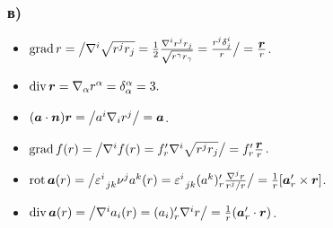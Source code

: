 \subsubsection*{в)}
	\begin{itemize}
	\itemsep0pt
		\item  $\mathop{\mathrm{grad}}\nolimits r = \big/ \nabla^i \sqrt{r^j r_j} = \frac{1}{2}\frac{\nabla^i r^j r_j}{\sqrt{r^\gamma r_\gamma}} = \frac{r^j \delta_{j}^{i}}{r} \big/ = \frac{\mbox{\boldmath $r$}}{r}$.

		\item $\mathop{\mathrm{div}}\nolimits \mbox{\boldmath $r$} = \nabla_\alpha r^\alpha = \delta_\alpha^\alpha = 3. \phantom{\big/} $

		\item $(\mbox{\boldmath $a$} \cdot \mbox{\boldmath $n$}) \mbox{\boldmath $r$}= \big/ a^i \nabla_i r^j \big/ = \mbox{\boldmath $a$}$.

		\item $\mathop{\mathrm{grad}}\nolimits f (r) = \big/
		\nabla^i f(r) = f_r' \nabla^i \sqrt{r^j r_j}
		\big/ = f_r' \frac{\mbox{\boldmath $r$}}{r}$.

		\item $\mathop{\mathrm{rot}}\nolimits \mbox{\boldmath $a$}(r) = \big/ \varepsilon_{\phantom{0} j k}^{i} \nu^j a^k(r) = \varepsilon_{\phantom{0} j k}^{i} (a^k)_r' \frac{\nabla^j r}{r^j/r} \big/ = \frac{1}{r} [\mbox{\boldmath $a$}_r' \times \mbox{\boldmath $r$}]$.

		\item $\mathop{\mathrm{div}}\nolimits \mbox{\boldmath $a$}(r) = \big/ \nabla^i a_i(r) = (a_i)_r' \nabla^i r \big/ = \frac{1}{r} (\mbox{\boldmath $a$}_r' \cdot \mbox{\boldmath $r$})$.
	\end{itemize}


